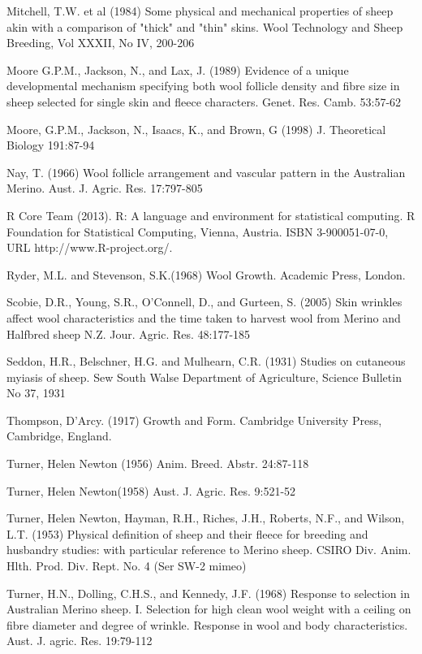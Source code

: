 \documentclass[titlepage]{article}  %
\begin{document}
\begin{thebibliography}{99}
Mitchell, T.W. et al (1984) Some physical and mechanical properties of sheep akin with a comparison of "thick" and "thin" skins. Wool Technology and Sheep Breeding, Vol XXXII, No IV, 200-206

Moore G.P.M., Jackson, N., and Lax, J. (1989) Evidence of a unique developmental mechanism specifying both wool follicle density and fibre size in sheep selected for single skin and fleece characters. Genet. Res. Camb. 53:57-62

Moore, G.P.M., Jackson, N., Isaacs, K., and Brown, G (1998) J. Theoretical Biology 191:87-94

Nay, T. (1966) Wool follicle arrangement and vascular pattern in the Australian Merino. Aust. J. Agric. Res. 17:797-805

R Core Team (2013). R: A language and environment for statistical
  computing. R Foundation for Statistical Computing, Vienna, Austria.
  ISBN 3-900051-07-0, URL http://www.R-project.org/.

Ryder, M.L. and Stevenson, S.K.(1968) Wool Growth. Academic Press, London.

Scobie, D.R., Young, S.R., O'Connell, D., and Gurteen, S. (2005) Skin wrinkles affect wool characteristics and the time taken to harvest wool from Merino and Halfbred sheep N.Z. Jour. Agric. Res. 48:177-185

Seddon, H.R., Belschner, H.G. and Mulhearn, C.R. (1931)  Studies on cutaneous myiasis of sheep. Sew South Walse Department of Agriculture, Science Bulletin No 37, 1931

Thompson, D'Arcy. (1917) Growth and Form. Cambridge University Press, Cambridge, England.

Turner, Helen Newton (1956) Anim. Breed. Abstr. 24:87-118

Turner, Helen Newton(1958) Aust. J. Agric. Res. 9:521-52

Turner, Helen Newton, Hayman, R.H., Riches, J.H., Roberts, N.F., and Wilson, L.T. (1953) Physical definition of sheep and their fleece for breeding and husbandry studies: with particular reference to Merino sheep. CSIRO Div. Anim. Hlth. Prod. Div. Rept. No. 4 (Ser SW-2 mimeo)

Turner, H.N., Dolling, C.H.S., and Kennedy, J.F. (1968) Response to selection in Australian Merino sheep. I. Selection for high clean wool weight with a ceiling on fibre diameter and degree of wrinkle. Response in wool and body characteristics. Aust. J. agric. Res. 19:79-112


\end{thebibliography}
\end{document}
